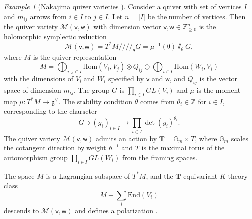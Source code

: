\documentclass[reqno]{amsart}
\numberwithin{equation}{section}
\numberwithin{equation}{section}
\numberwithin{equation}{section}
\theoremstyle{definition}
\theoremstyle{remark}
\theoremstyle{remark}
\newtheorem{example}[thm]{Example}
\begin{document}
\begin{example}[Nakajima quiver varieties \cite{Nak94}]
Consider a quiver with set of vertices $I$ and $m_{ij}$ arrows from $i \in I$ to $j \in I$. Let $n = |I|$ be the number of vertices. Then the quiver variety $\mathcal{M}(\mathsf{v}, \mathsf{w})$ with dimension vector $\mathsf{v}, \mathsf{w} \in \mathbb{Z}_{\geq 0}^n$ is the holomorphic symplectic reduction
\begin{equation}
    \mathcal{M}(\mathsf{v}, \mathsf{w}) = T^*M  /\!\!/\!\!/\!\!/_{\theta} G = \mu^{-1}(0) \sslash_{\theta} G,
\end{equation}
where $M$ is the quiver representation
\begin{equation}
    M = \bigoplus_{i,j \in I} \mathrm{Hom}(V_i, V_j) \otimes Q_{ij} \oplus \bigoplus_{i \in I}\mathrm{Hom}(W_i, V_i)
\end{equation}
with the dimensions of $V_i$ and $W_i$ specified by $\mathsf{v}$ and $\mathsf{w}$, and $Q_{ij}$ is the vector space of dimension $m_{ij}$. The group $G$ is $\prod_{i \in I}GL(V_i)$ and $\mu$ is the moment map $\mu: T^*M \to \mathfrak{g}^{\vee}$. The stability condition $\theta$ comes from $\theta_i \in \mathbb{Z}$ for $i \in I$, corresponding to the character
\begin{equation}
    G \ni (g_i)_{i \in I} \to \prod_{i \in I} \det(g_i)^{\theta_i}.
\end{equation}
The quiver variety $\mathcal{M}(\mathsf{v}, \mathsf{w})$ admits an action by $\mathbf{T} = \mathbb{G}_m \times T$, where $\mathbb{G}_m$ scales the cotangent direction by weight $\hbar^{-1}$ and $T$ is the maximal torus of the automorphism group $\prod_{i \in I} GL(W_i)$ from the framing spaces.

The space $M$ is a Lagrangian subspace of $T^* M$, and the $\mathbf{T}$-equivariant $K$-theory class
\begin{equation}
    M - \sum_{i} \mathrm{End}(V_i)
\end{equation}
descends to $\mathcal{M}(\mathsf{v}, \mathsf{w})$ and defines a polarization \cite[Section 6.1]{Oko17}.
\end{example}
\end{document}
